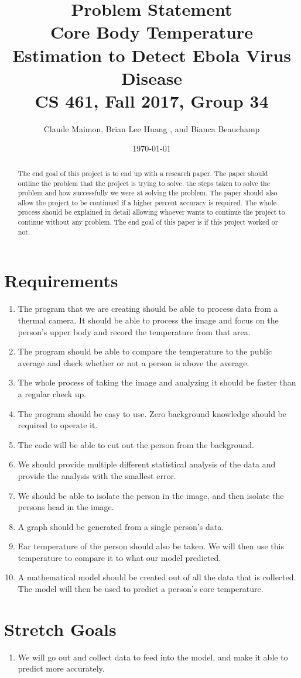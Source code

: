 \documentclass{article}
\title{%
  Problem Statement \\
  \vspace{0.4cm}
  \large Core Body Temperature Estimation to Detect Ebola Virus Disease \\
  \vspace{0.4cm}
  \large CS 461, Fall 2017, Group 34\\
    }
\author{Claude Maimon,  Brian Lee Huang , and Bianca Beauchamp}
\date{\today}
\begin{document}
\maketitle


\begin{abstract}
	The end goal of this project is to end up with a research paper. The paper should outline the problem that the project is trying to solve, the steps taken to solve the problem and how successfully we were
	at solving the problem. The paper should also allow the project to be continued if a higher percent accuracy is required. The whole process should be explained in detail allowing whoever wants to continue the
	project to continue without any problem. The end goal of this paper is if this project worked or not.
\end{abstract}

\newpage
\section{Requirements}
	\begin{enumerate}
		\item The program that we are creating should be able to process data from a thermal camera. It should be able to process the image and focus on the person's upper body and record the temperature from that area.
		\item The program should be able to compare the temperature to the public average and check whether or not a person is above the average.
		\item The whole process of taking the image and analyzing it should be faster than a regular check up.
		\item The program should be easy to use. Zero background knowledge should be required to operate it.
		\item The code will be able to cut out the person from the background.
		\item We should provide multiple different statistical analysis of the data and provide the analysis with the smallest error.
		\item We should be able to isolate the person in the image, and then isolate the persons head in the image.
		\item A graph should be generated from a single person's data.
		\item Ear temperature of the person should also be taken. We will then use this temperature to compare it to what our model predicted.
		\item A mathematical model should be created out of all the data that is collected. The model will then be used to predict a person's core temperature.
	\end{enumerate}
\section{Stretch Goals}
	\begin{enumerate}
		\item We will go out and collect data to feed into the model, and make it able to predict more accurately.
	\end{enumerate}
\end{document}
